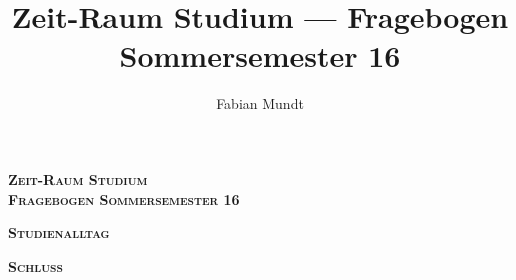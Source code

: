 \documentclass[
  german,
  globalid=Sommersemester-16,
  print_questionnaire_id,
  twoside,
  style=qr,
  pagemark,
  stamp]{sdaps}
\author{Fabian Mundt}
\title{Zeit-Raum Studium --- Fragebogen Sommersemester 16}
\begin{document}

  \begin{questionnaire}[noinfo]



    \begin{center}
		\textbf{\textsc{\Huge Zeit-Raum Studium}} \\
		\vspace{.5cm}
		\textbf{\textsc{\LARGE Fragebogen Sommersemester 16}}
	\end{center}
	\vspace{.15cm}

	\thispagestyle{empty}
	\sdapspagemark

    

    \clearpage
	\pagestyle{scrheadings}

    \begin{center}
		\textbf{\textsc{\Huge Studienalltag}}
	\end{center}
    \vspace{.15cm}

	

	

	

	


    \newpage
    \begin{center}
		\textbf{\textsc{\Huge Schluss}}
	\end{center}
	\vspace{.15cm}

	


  \end{questionnaire}
\end{document}
